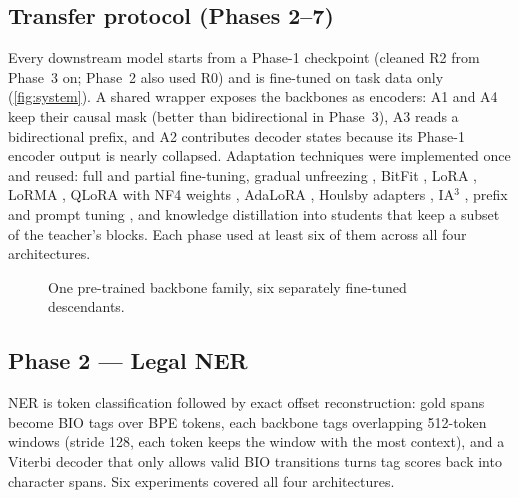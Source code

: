 \documentclass[11pt, oneside]{article}
\begin{document}
\subsection{Transfer protocol (Phases 2--7)}
Every downstream model starts from a Phase-1 checkpoint (cleaned R2 from Phase~3 on; Phase~2 also used R0)
and is fine-tuned on task data only (\autoref{fig:system}).  A shared wrapper exposes the backbones as
encoders: A1 and A4 keep their causal mask (better than bidirectional in Phase~3), A3 reads a bidirectional
prefix, and A2 contributes decoder states because its Phase-1 encoder output is nearly collapsed.
Adaptation techniques were implemented once and reused: full and partial fine-tuning, gradual unfreezing
\cite{howard2018ulmfit}, BitFit \cite{benzaken2022bitfit}, LoRA \cite{hu2022lora}, LoRMA
\cite{bihany2025lorma}, QLoRA with NF4 weights \cite{dettmers2023qlora}, AdaLoRA \cite{zhang2023adalora},
Houlsby adapters \cite{houlsby2019adapters}, IA$^3$ \cite{liu2022ia3}, prefix \cite{li2021prefix} and prompt
tuning \cite{lester2021prompt}, and knowledge distillation \cite{hinton2015kd} into students that keep a subset
of the teacher's blocks.  Each phase used at least six of them across all four architectures.

\begin{figure}[!t]\centering
{}
\caption{One pre-trained backbone family, six separately fine-tuned descendants.}\label{fig:system}
\end{figure}

\subsection{Phase 2 --- Legal NER}
NER is token classification followed by exact offset reconstruction: gold spans become BIO tags over BPE
tokens, each backbone tags overlapping 512-token windows (stride 128, each token keeps the window with the most
context), and a Viterbi decoder that only allows valid BIO transitions turns tag scores back into character
spans.  Six experiments covered all four architectures.
\end{document}
